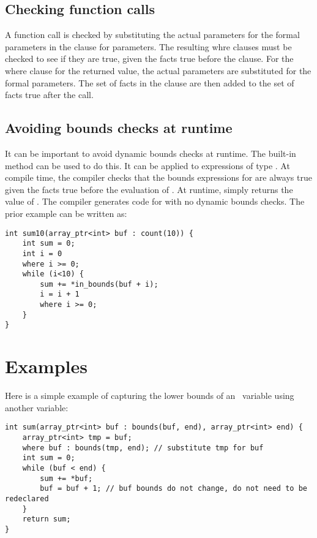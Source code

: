 \subsection{Checking function calls}

A function call is checked by substituting the actual parameters for the
formal parameters in the  clause for parameters.  The
resulting whre clauses must be checked to see if they are true, given
the facts true before the clause.  For the where clause for the returned
value, the actual parameters are substituted for the formal parameters.
The set of facts in the clause are then added to the set of facts true
after the call.

\subsection{Avoiding bounds checks at runtime}
\label{section:avoiding-bounds-checks}

It can be important to avoid dynamic bounds checks at runtime. The
built-in method  can be used to do this. It can be applied
to expressions of type \arrayptr. At compile time, the compiler
checks that the bounds expressions for  are always true given the
facts true before the evaluation of . At runtime, 
simply returns the value of . The compiler generates code for
\code{*} with no dynamic bounds checks. The prior example
can be written as:

\begin{lstlisting}
int sum10(array_ptr<int> buf : count(10)) {
    int sum = 0;
    int i = 0
    where i >= 0;
    while (i<10) {
        sum += *in_bounds(buf + i);
        i = i + 1
        where i >= 0;
    }
}
\end{lstlisting}

\section{Examples}

Here is a simple example of capturing the lower bounds of an
\arrayptr\ variable using another variable:

\begin{lstlisting}
int sum(array_ptr<int> buf : bounds(buf, end), array_ptr<int> end) {
    array_ptr<int> tmp = buf;
    where buf : bounds(tmp, end); // substitute tmp for buf
    int sum = 0;
    while (buf < end) {
        sum += *buf;   
        buf = buf + 1; // buf bounds do not change, do not need to be redeclared
    }
    return sum;
}
\end{lstlisting}

